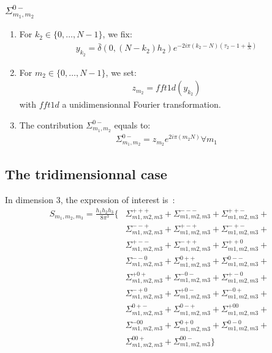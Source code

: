 \subsubsection{$\Sigma_{m_1,m_2}^{0-}$}
\begin{enumerate}
\item For $k_2\in\{0,\hdots,N-1\}$, we fix:
\begin{align*}
y_{k_2}= \bar{\delta}(0,(N-k_2)h_2)e^{-2i\pi (k_2-N)\left(\tau_2-1+\frac{1}{N}\right)}
\end{align*}
\item For $m_2\in\{0,\hdots,N-1\}$, we set:
\begin{align*}
  z_{m_2}=fft1d(y_{k_2})
\end{align*}
with $fft1d$ a unidimensionnal Fourier transformation.
\item The contribution $\Sigma_{m_1,m_2}^{0-}$ equals to:
\begin{align*}
  \Sigma_{m_1,m_2}^{0-}=z_{m_2}e^{2i\pi\left(m_2 N\right)} \forall m_1
\end{align*}
\end{enumerate}

\subsection{The tridimensionnal case}
In dimension 3, the expression of interest is~:
\begin{align*}
S_{m_1,m_2,m_3}=\frac{h_1h_2h_3}{8\pi^3}\Big\{& \Sigma_{m1,m2,m3}^{+++} + \Sigma_{m1,m2,m3}^{---} + \Sigma_{m1,m2,m3}^{++-} +\nonumber\\
     &\Sigma_{m1,m2,m3}^{--+} + \Sigma_{m1,m2,m3}^{+-+} + \Sigma_{m1,m2,m3}^{-+-} +\nonumber\\
     &\Sigma_{m1,m2,m3}^{+--} + \Sigma_{m1,m2,m3}^{-++} + \Sigma_{m1,m2,m3}^{++0} +\nonumber\\
     &\Sigma_{m1,m2,m3}^{--0} + \Sigma_{m1,m2,m3}^{0++} + \Sigma_{m1,m2,m3}^{0--} +\nonumber\\
     &\Sigma_{m1,m2,m3}^{+0+} + \Sigma_{m1,m2,m3}^{-0-} + \Sigma_{m1,m2,m3}^{+-0} +\nonumber\\
     &\Sigma_{m1,m2,m3}^{-+0} + \Sigma_{m1,m2,m3}^{+0-} + \Sigma_{m1,m2,m3}^{-0+} +\nonumber\\
     &\Sigma_{m1,m2,m3}^{0+-} + \Sigma_{m1,m2,m3}^{0-+} + \Sigma_{m1,m2,m3}^{+00} +\nonumber\\
     &\Sigma_{m1,m2,m3}^{-00} + \Sigma_{m1,m2,m3}^{0+0} + \Sigma_{m1,m2,m3}^{0-0} +\nonumber\\
     &\Sigma_{m1,m2,m3}^{00+} + \Sigma_{m1,m2,m3}^{00-}
\Big\}
\end{align*}

